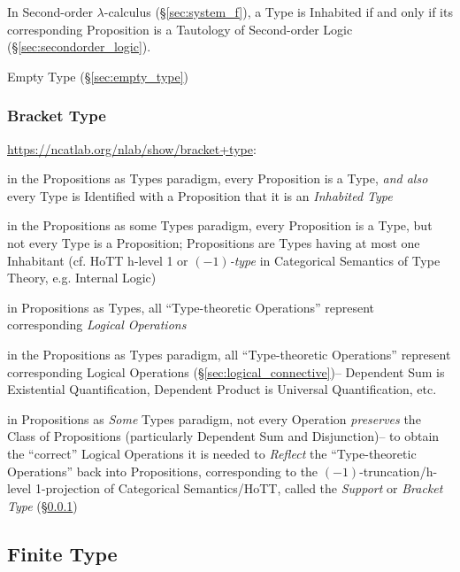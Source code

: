 In Second-order $\lambda$-calculus (\S\ref{sec:system_f}), a
Type is Inhabited if and only if its corresponding Proposition is a
Tautology of Second-order Logic (\S\ref{sec:secondorder_logic}).

Empty Type (\S\ref{sec:empty_type})



\subsubsection{Bracket Type}\label{sec:bracket_type}

\url{https://ncatlab.org/nlab/show/bracket+type}:

in the Propositions as Types paradigm, every Proposition is a Type, \emph{and
  also} every Type is Identified with a Proposition that it is an
\emph{Inhabited Type}

in the Propositions as some Types paradigm, every Proposition is a Type, but
not every Type is a Proposition; Propositions are Types having at most one
Inhabitant (cf. HoTT h-level 1 or \emph{$(-1)$-type} in Categorical Semantics of
Type Theory, e.g. Internal Logic)

in Propositions as Types, all ``Type-theoretic Operations'' represent
corresponding \emph{Logical Operations}

in the Propositions as Types paradigm, all ``Type-theoretic Operations''
represent corresponding Logical Operations (\S\ref{sec:logical_connective})--
Dependent Sum is Existential Quantification, Dependent Product is Universal
Quantification, etc.

in Propositions as \emph{Some} Types paradigm, not every Operation
\emph{preserves} the Class of Propositions (particularly Dependent Sum and
Disjunction)-- to obtain the ``correct'' Logical Operations it is needed to
\emph{Reflect} the ``Type-theoretic Operations'' back into Propositions,
corresponding to the $(-1)$-truncation/h-level 1-projection of Categorical
Semantics/HoTT, called the \emph{Support} or \emph{Bracket Type}
(\S\ref{sec:bracket_type})



\subsection{Finite Type}\label{sec:finite_type}

